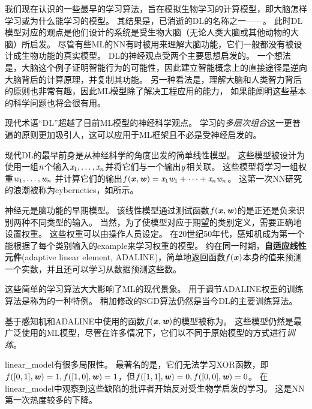 我们现在认识的一些最早的学习算法，旨在模拟生物学习的计算模型，即大脑怎样学习或为什么能学习的模型。
其结果是，已消逝的\gls{DL}的名称之一——。
此时\gls{DL}模型对应的观点是他们设计的系统是受生物大脑（无论人类大脑或其他动物的大脑）所启发。
尽管有些\gls{ML}的\gls{NN}有时被用来理解大脑功能\citep{hinton1991lesioning}，它们一般都没有被设计成生物功能的真实模型。
\gls{DL}的神经观点受两个主要思想启发的。
一个想法是，大脑这个例子证明智能行为的可能性，因此建立智能概念上的直接途径是逆向大脑背后的计算原理，并复制其功能。
另一种看法是，理解大脑和人类智力背后的原则也非常有趣，因此\gls{ML}模型除了解决工程应用的能力， 如果能阐明这些基本的科学问题也将会很有用。 

  
现代术语``\gls{DL}''超越了目前\gls{ML}模型的神经科学观点。
学习的\emph{多层次组合}这一更普遍的原则更加吸引人，这可以应用于\gls{ML}框架且不必是受神经启发的。
 
 
现代\gls{DL}的最早前身是从神经科学的角度出发的简单线性模型。
这些模型被设计为使用一组$\mathit{n}$个输入$\mathit{x}_1, \dots ,\mathit{x}_n$并将它们与一个输出$\mathit{y}$相关联。 
这些模型将学习一组权重$\mathit{w}_1, \dots, \mathit{w}_n $ 并计算它们的输出$f(\boldsymbol{\mathit{x}}, \boldsymbol{\mathit{w}}) = \mathit{x}_1 \mathit{w}_1 + \dots + \mathit{x}_n \mathit{w}_n$。
这第一次\gls{NN}研究的浪潮被称为\gls{cybernetics}，如所示。

神经元\citep{McCulloch43}是脑功能的早期模型。
该线性模型通过测试函数$f(\boldsymbol{\mathit{x}},\boldsymbol{\mathit{w}})$的是正还是负来识别两种不同类型的输入。
当然，为了使模型对应于期望的类别定义，需要正确地设置权重。
这些权重可以由操作人员设定。
在20世纪50年代，感知机\citep{Rosenblatt-1956,Rosenblatt-1958}成为第一个能根据了每个类别输入的\gls{example}来学习权重的模型。
约在同一时期，\textbf{自适应线性元件}(adaptive linear element, ADALINE)，简单地返回函数$f(\boldsymbol{\mathit{x}})$本身的值来预测一个实数\citep{Widrow60}，并且还可以学习从数据预测这些数。

这些简单的学习算法大大影响了\gls{ML}的现代景象。
用于调节ADALINE权重的训练算法是称为的一种特例。
稍加修改的\gls{SGD}算法仍然是当今\gls{DL}的主要训练算法。

基于感知机和ADALINE中使用的函数$f(\boldsymbol{\mathit{x}}, \boldsymbol{\mathit{w}})$的模型被称为。
这些模型仍然是最广泛使用的\gls{ML}模型，尽管在许多情况下，它们以不同于原始模型的方式进行\emph{训练}。

\gls{linear_model}有很多局限性。
最著名的是，它们无法学习XOR函数，即$f([0,1], \boldsymbol{\mathit{w}}) = 1, f([1,0], \boldsymbol{\mathit{w}})=1$，但$f([1,1], \boldsymbol{\mathit{w}})=0, f([0,0],\boldsymbol{\mathit{w}})= 0$。
在\gls{linear_model}中观察到这些缺陷的批评者开始反对受生物学启发的学习\citep{Minsky69}。
这是\gls{NN}第一次热度较多的下降。

